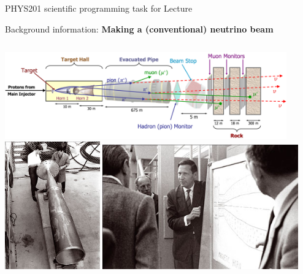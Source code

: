 %
%

{
\programmingslide

%
%
%

\begin{frame}{PHYS201 scientific programming task for Lecture \thislecture}

  Background information: {\bf Making a (conventional) neutrino beam}\\

  \begin{columns}
    \begin{column}{0.78\textwidth}
      \centering
      \includegraphics[width=0.95\textwidth]{./images/schematics/numi.png}\\
      \vspace{0.2cm}
      \includegraphics[width=0.32\textwidth]{./images/photos/beam_horn_old_1.jpg}
      \hfill
      \includegraphics[width=0.66\textwidth]{./images/photos/beam_horn_old_3.jpg}
    \end{column}
    \begin{column}{0.22\textwidth}

\end{column}
\end{columns}
\end{frame}}
